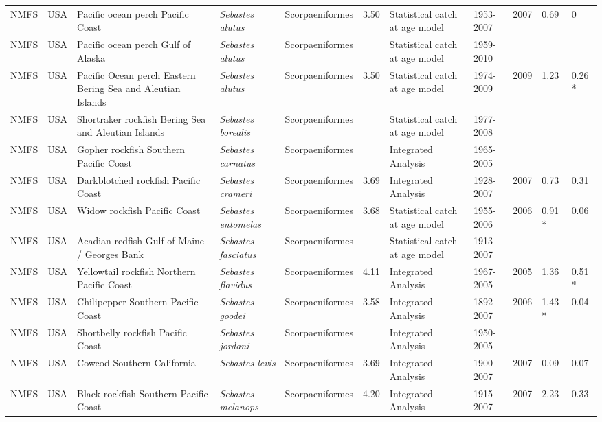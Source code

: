 \begin{longtable}{p{1.5cm}p{1.5cm}p{3cm}p{3cm}p{2.5cm}p{0.9cm}p{1.4cm}p{0.9cm}p{0.9cm}p{0.9cm}p{1cm}}
  NMFS & USA & Pacific ocean perch Pacific Coast & \textit{Sebastes alutus} & Scorpaeniformes & 3.50 & Statistical catch at age model & 1953-2007 & 2007 & 0.69 & 0 \\ 
  NMFS & USA & Pacific ocean perch Gulf of Alaska & \textit{Sebastes alutus} & Scorpaeniformes &  & Statistical catch at age model & 1959-2010 &  &  &  \\ 
  NMFS & USA & Pacific Ocean perch Eastern Bering Sea and Aleutian Islands & \textit{Sebastes alutus} & Scorpaeniformes & 3.50 & Statistical catch at age model & 1974-2009 & 2009 & 1.23 & 0.26 * \\ 
  NMFS & USA & Shortraker rockfish Bering Sea and Aleutian Islands & \textit{Sebastes borealis} & Scorpaeniformes &  & Statistical catch at age model & 1977-2008 &  &  &  \\ 
  NMFS & USA & Gopher rockfish Southern Pacific Coast & \textit{Sebastes carnatus} & Scorpaeniformes &  & Integrated Analysis & 1965-2005 &  &  &  \\ 
  NMFS & USA & Darkblotched rockfish Pacific Coast & \textit{Sebastes crameri} & Scorpaeniformes & 3.69 & Integrated Analysis & 1928-2007 & 2007 & 0.73 & 0.31 \\ 
  NMFS & USA & Widow rockfish Pacific Coast & \textit{Sebastes entomelas} & Scorpaeniformes & 3.68 & Statistical catch at age model & 1955-2006 & 2006 & 0.91 * & 0.06 \\ 
  NMFS & USA & Acadian redfish Gulf of Maine / Georges Bank & \textit{Sebastes fasciatus} & Scorpaeniformes &  & Statistical catch at age model & 1913-2007 &  &  &  \\ 
  NMFS & USA & Yellowtail rockfish Northern Pacific Coast & \textit{Sebastes flavidus} & Scorpaeniformes & 4.11 & Integrated Analysis & 1967-2005 & 2005 & 1.36 & 0.51 * \\ 
  NMFS & USA & Chilipepper Southern Pacific Coast & \textit{Sebastes goodei} & Scorpaeniformes & 3.58 & Integrated Analysis & 1892-2007 & 2006 & 1.43 * & 0.04 \\ 
  NMFS & USA & Shortbelly rockfish Pacific Coast & \textit{Sebastes jordani} & Scorpaeniformes &  & Integrated Analysis & 1950-2005 &  &  &  \\ 
  NMFS & USA & Cowcod Southern California & \textit{Sebastes levis} & Scorpaeniformes & 3.69 & Integrated Analysis & 1900-2007 & 2007 & 0.09 & 0.07 \\ 
  NMFS & USA & Black rockfish Southern Pacific Coast & \textit{Sebastes melanops} & Scorpaeniformes & 4.20 & Integrated Analysis & 1915-2007 & 2007 & 2.23 & 0.33 \\ 

\end{longtable}
